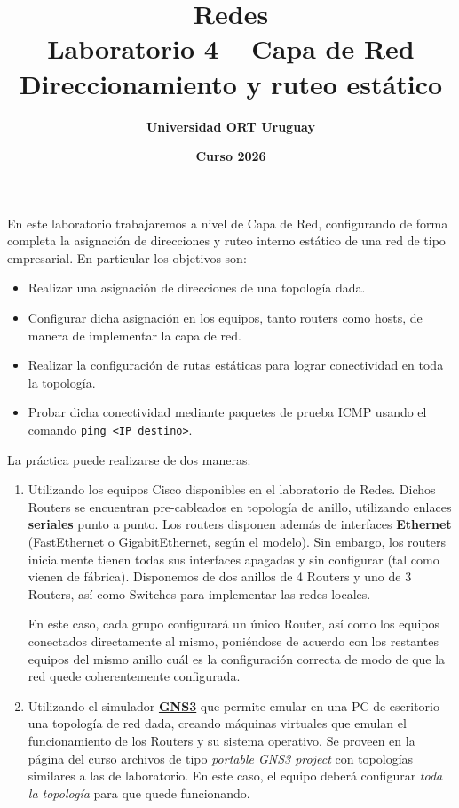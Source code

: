 \documentclass[a4paper,10pt]{article}
\title{\bf Redes\\Laboratorio 4 -- Capa de Red\\ Direccionamiento y ruteo estático}
\author{\bf Universidad ORT Uruguay}
\date{\bf Curso 2026}
\begin{document}
\maketitle
\thispagestyle{fancy}

En este laboratorio trabajaremos a nivel de Capa de Red, configurando de forma completa la asignación de direcciones y ruteo interno estático de una red de tipo empresarial. En particular los objetivos son:

\begin{itemize}
    \item Realizar una asignación de direcciones de una topología dada.
    \item Configurar dicha asignación en los equipos, tanto routers como hosts, de manera de implementar la capa de red.
    \item Realizar la configuración de rutas estáticas para lograr conectividad en toda la topología.
    \item Probar dicha conectividad mediante paquetes de prueba ICMP usando el comando \texttt{ping <IP destino>}.
\end{itemize}

La práctica puede realizarse de dos maneras:

\begin{enumerate}[label={\bf \alph*)}]
    \item Utilizando los equipos Cisco disponibles en el laboratorio de Redes. Dichos Routers se encuentran pre-cableados en topología de anillo, utilizando enlaces \textbf{seriales} punto a punto. Los routers disponen además de interfaces \textbf{Ethernet} (FastEthernet o GigabitEthernet, según el modelo). Sin embargo, los routers inicialmente tienen todas sus interfaces apagadas y sin configurar (tal como vienen de fábrica). Disponemos de dos anillos de 4 Routers y uno de 3 Routers, así como Switches para implementar las redes locales.
    
    En este caso, cada grupo configurará un único Router, así como los equipos conectados directamente al mismo, poniéndose de acuerdo con los restantes equipos del mismo anillo cuál es la configuración correcta de modo de que la red quede coherentemente configurada.

    \item Utilizando el simulador \href{https://www.gns3.com/}{\bf GNS3} que permite emular en una PC de escritorio una topología de red dada, creando máquinas virtuales que emulan el funcionamiento de los Routers y su sistema operativo. Se proveen en la página del curso archivos de tipo \emph{portable GNS3 project} con topologías similares a las de laboratorio. En este caso, el equipo deberá configurar \emph{toda la topología} para que quede funcionando.
    
\end{enumerate}
\end{document}
